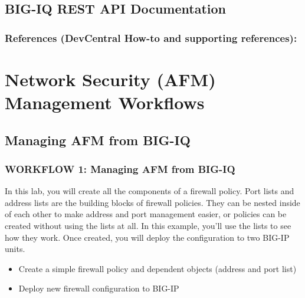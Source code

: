 \documentclass[letterpaper,10pt,english]{sphinxmanual}
\begin{document}
\subsection{BIG-IQ REST API Documentation}
\label{\detokenize{class1/module4/lab7:big-iq-rest-api-documentation}}\label{\detokenize{class1/module4/lab7::doc}}

\subsubsection{References (DevCentral How-to and supporting references):}
\label{\detokenize{class1/module4/lab7:references-devcentral-how-to-and-supporting-references}}


\section{Network Security (AFM) Management Workflows}
\label{\detokenize{class1/module5/module5:network-security-afm-management-workflows}}\label{\detokenize{class1/module5/module5::doc}}

\subsection{Managing AFM from BIG-IQ}
\label{\detokenize{class1/module5/lab1:managing-afm-from-big-iq}}\label{\detokenize{class1/module5/lab1::doc}}

\subsubsection{WORKFLOW 1: Managing AFM from BIG-IQ}
\label{\detokenize{class1/module5/lab1:workflow-1-managing-afm-from-big-iq}}
In this lab, you will create all the components of a firewall policy.
Port lists and address lists are the building blocks of firewall
policies. They can be nested inside of each other to make address and
port management easier, or policies can be created without using the
lists at all. In this example, you’ll use the lists to see how they
work. Once created, you will deploy the configuration to two BIG-IP
units.

\begin{itemize}
\item {} 
Create a simple firewall policy and dependent objects (address and
port list)

\item {} 
Deploy new firewall configuration to BIG-IP

\end{itemize}
\end{document}
